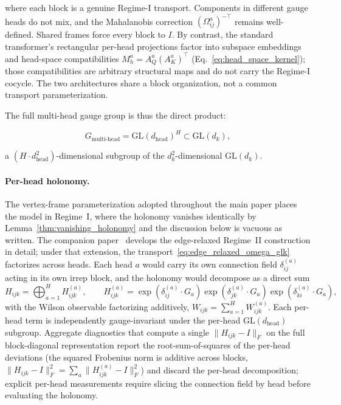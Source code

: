 \documentclass[twoside,11pt]{article}
\begin{document}
where each block is a genuine Regime-I transport. Components in different gauge heads do not mix, and the Mahalanobis correction $(\Omega_{ij}^a)^{-\top}$ remains well-defined. Shared frames force every block to $I$. By contrast, the standard transformer's rectangular per-head projections factor into subspace embeddings and head-space compatibilities $M_h^a = A_Q^a(A_K^a)^\top$ (Eq.~\ref{eq:head_space_kernel}); those compatibilities are arbitrary structural maps and do not carry the Regime-I cocycle. The two architectures share a block organization, not a common transport parameterization.

The full multi-head gauge group is thus the direct product:

\begin{equation}
G_{\text{multi-head}} = \mathrm{GL}(d_{\text{head}})^H \subset \mathrm{GL}(d_k),
\end{equation}

a $(H \cdot d_{\text{head}}^2)$-dimensional subgroup of the $d_k^2$-dimensional $\mathrm{GL}(d_k)$.

\paragraph{Per-head holonomy.} The vertex-frame parameterization adopted throughout the main paper places the model in Regime~I, where the holonomy vanishes identically by Lemma~\ref{thm:vanishing_holonomy} and the discussion below is vacuous as written. The companion paper~\citep{Dennis2025it} develops the edge-relaxed Regime~II construction in detail; under that extension, the transport~\eqref{eq:edge_relaxed_omega_glk} factorizes across heads. Each head $a$ would carry its own connection field $\delta_{ij}^{(a)}$ acting in its own irrep block, and the holonomy would decompose as a direct sum
\begin{equation}
H_{ijk} = \bigoplus_{a=1}^{H} H_{ijk}^{(a)},
\qquad
H_{ijk}^{(a)} = \exp(\delta_{ij}^{(a)}\cdot G_a) \exp(\delta_{jk}^{(a)}\cdot G_a) \exp(\delta_{ki}^{(a)}\cdot G_a),
\end{equation}
with the Wilson observable factorizing additively, $W_{ijk} = \sum_{a=1}^H W_{ijk}^{(a)}$. Each per-head term is independently gauge-invariant under the per-head $\mathrm{GL}(d_{\text{head}})$ subgroup. Aggregate diagnostics that compute a single $\|H_{ijk} - I\|_F$ on the full block-diagonal representation report the root-sum-of-squares of the per-head deviations (the squared Frobenius norm is additive across blocks, $\|H_{ijk}-I\|_F^2 = \sum_a \|H_{ijk}^{(a)}-I\|_F^2$) and discard the per-head decomposition; explicit per-head measurements require slicing the connection field by head before evaluating the holonomy.
\end{document}
